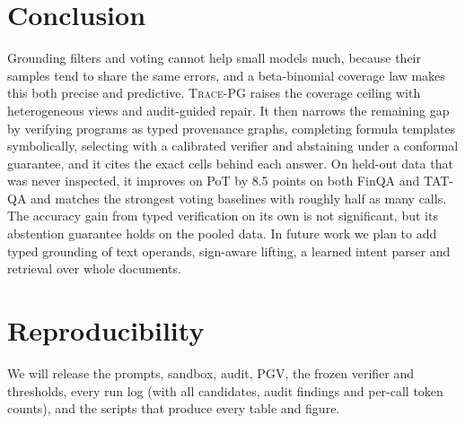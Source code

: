 \documentclass[conference]{IEEEtran}
\newcommand{\ours}{\textsc{Trace-PG}}
\begin{document}
\section{Conclusion}
Grounding filters and voting cannot help small models much, because their samples tend to share the same errors, and a beta-binomial coverage law makes this both precise and predictive. \ours{} raises the coverage ceiling with heterogeneous views and audit-guided repair. It then narrows the remaining gap by verifying programs as typed provenance graphs, completing formula templates symbolically, selecting with a calibrated verifier and abstaining under a conformal guarantee, and it cites the exact cells behind each answer. On held-out data that was never inspected, it improves on PoT by 8.5 points on both FinQA and TAT-QA and matches the strongest voting baselines with roughly half as many calls. The accuracy gain from typed verification on its own is not significant, but its abstention guarantee holds on the pooled data. In future work we plan to add typed grounding of text operands, sign-aware lifting, a learned intent parser and retrieval over whole documents.

\section*{Reproducibility}
We will release the prompts, sandbox, audit, PGV, the frozen verifier and thresholds, every run log (with all candidates, audit findings and per-call token counts), and the scripts that produce every table and figure.



\end{document}
